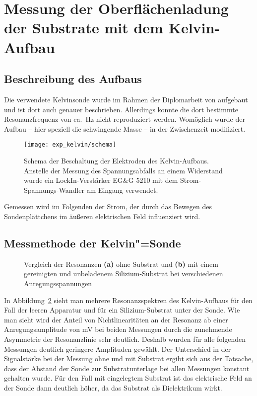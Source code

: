 \section{Messung der Oberflächenladung der Substrate mit dem Kelvin-Aufbau}

\subsection{Beschreibung des Aufbaus}
Die verwendete Kelvinsonde wurde im Rahmen der Diplomarbeit von  \cite{uli} aufgebaut und ist dort auch genauer beschrieben. Allerdings konnte die dort bestimmte Resonanzfrequenz von ca.\ \unit[390]{Hz} nicht reproduziert werden. Womöglich wurde der Aufbau -- hier speziell die schwingende Masse -- in der Zwischenzeit modifiziert.
\begin{figure}[h!tbp]
	\texttt{[image: exp\_kelvin/schema]}\hfill
	\begin{minipage}[b]{\textwidth-\tabcolsep-\smidwidth}
		\caption[Schema der Messung des Kelvinsignals]{Schema der Beschaltung der Elektroden des Kelvin-Aufbaus. Anstelle der Messung des Spannungsabfalls an einem Widerstand wurde ein LockIn-Verstärker EG\&G 5210 mit dem Strom-Spannungs-Wandler am Eingang verwendet.}
		\label{fig:kelvin_schema}
	\end{minipage}
\end{figure}

Gemessen wird im Folgenden der Strom, der durch das Bewegen des Sondenplättchens im äußeren elektrischen Feld influenziert wird.

\subsection{Messmethode der Kelvin"=Sonde}
\begin{figure}[h!tbp]
	\centerline{%
		}
	\caption[Resonanzkurven des Kelvin"=Aufbaus]{Vergleich der Resonanzen {\bfseries (a)} ohne Substrat und {\bfseries (b)} mit einem gereinigten und unbeladenem Silizium-Substrat bei verschiedenen Anregungsspannungen}
	\label{fig:kelvin_spectrum}
\end{figure}
In Abbildung~\ref{fig:kelvin_spectrum} sieht man mehrere Resonanzspektren des Kelvin-Aufbaus für den Fall der leeren Apparatur und für ein Silizium-Substrat unter der Sonde. Wie man sieht wird der Anteil von Nichtlinearitäten an der Resonanz ab einer Anregungsamplitude von \unit[750]{mV} bei beiden Messungen durch die zunehmende Asymmetrie der Resonanzlinie sehr deutlich. Deshalb wurden für alle folgenden Messungen deutlich geringere Amplituden gewählt. Der Unterschied in der Signalstärke bei der Messung ohne und mit Substrat ergibt sich aus der Tatsache, dass der Abstand der Sonde zur Substratunterlage bei allen Messungen konstant gehalten wurde. Für den Fall mit eingelegtem Substrat ist das elektrische Feld an der Sonde dann deutlich höher, da das Substrat als Dielektrikum wirkt.

